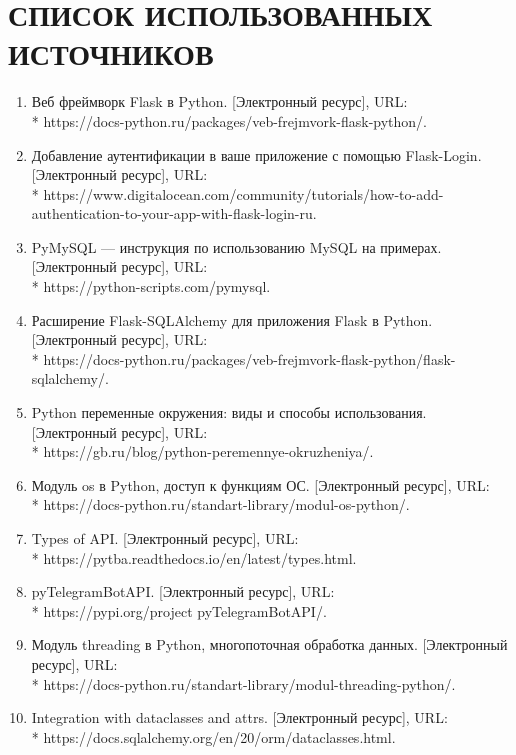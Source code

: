 \documentclass[12pt, oldlfont, amsfonts]{report}
\begin{document}
\chapter*{\large{{СПИСОК ИСПОЛЬЗОВАННЫХ ИСТОЧНИКОВ}}}
\begin{enumerate}
\item Веб фреймворк Flask в Python. [Электронный ресурс], URL: \\* https://docs-python.ru/packages/veb-frejmvork-flask-python/.
\item Добавление аутентификации в ваше приложение с помощью Flask-Login. [Электронный ресурс], URL: \\* https://www.digitalocean.com/community/tutorials/how-to-add-authentication-to-your-app-with-flask-login-ru.
\item PyMySQL — инструкция по использованию MySQL на примерах. [Электронный ресурс], URL: \\* https://python-scripts.com/pymysql.
\item Расширение Flask-SQLAlchemy для приложения Flask в Python. [Электронный ресурс], URL: \\* https://docs-python.ru/packages/veb-frejmvork-flask-python/flask-sqlalchemy/.
\item Python переменные окружения: виды и способы использования. [Электронный ресурс], URL: \\* https://gb.ru/blog/python-peremennye-okruzheniya/.
\item Модуль os в Python, доступ к функциям ОС. [Электронный ресурс], URL: \\* https://docs-python.ru/standart-library/modul-os-python/.
\item Types of API. [Электронный ресурс], URL: \\* https://pytba.readthedocs.io/en/latest/types.html.
\item pyTelegramBotAPI. [Электронный ресурс], URL: \\* https://pypi.org/project pyTelegramBotAPI/.
\item Модуль threading в Python, многопоточная обработка данных. [Электронный ресурс], URL: \\* https://docs-python.ru/standart-library/modul-threading-python/.
\item Integration with dataclasses and attrs. [Электронный ресурс], URL: \\* https://docs.sqlalchemy.org/en/20/orm/dataclasses.html.
\end{enumerate}
    
\end{document}
